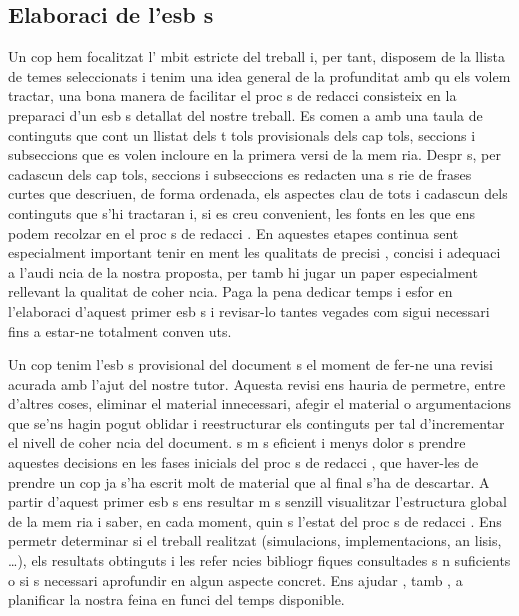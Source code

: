\subsection{Elaboraci  de l'esb s} Un cop hem focalitzat l' mbit estricte del treball i, per tant, disposem de la llista de temes seleccionats i tenim una idea general de la profunditat amb qu  els volem tractar, una bona manera de facilitar el proc s de redacci  consisteix en la preparaci  d'un esb s detallat del nostre treball. Es comen a amb una taula de continguts que cont  un llistat dels t tols provisionals dels cap tols, seccions i subseccions que es volen incloure en la primera versi  de la mem ria. Despr s, per cadascun dels cap tols, seccions i subseccions es redacten una s rie de frases curtes que descriuen, de forma ordenada, els aspectes clau de tots i cadascun dels continguts que s'hi tractaran i, si es creu convenient, les fonts en les que ens podem recolzar en el proc s de redacci . En aquestes etapes continua sent especialment important tenir en ment les qualitats de precisi , concisi  i adequaci  a l'audi ncia de la nostra proposta, per  tamb  hi jugar  un paper especialment rellevant la qualitat de coher ncia. Paga la pena dedicar temps i esfor  en l'elaboraci  d'aquest primer esb s i revisar-lo tantes vegades com sigui necessari fins a estar-ne totalment conven uts.

Un cop tenim l'esb s provisional del document  s el moment de fer-ne una revisi  acurada amb l'ajut del nostre tutor. Aquesta revisi  ens hauria de permetre, entre d'altres coses, eliminar el material innecessari, afegir el material o argumentacions que se'ns hagin pogut oblidar i reestructurar els continguts per tal d'incrementar el nivell de coher ncia del document.  s m s eficient i menys dolor s prendre aquestes decisions en les fases inicials del proc s de redacci , que haver-les de prendre un cop ja s'ha escrit molt de material que al final s'ha de descartar. A partir d'aquest primer esb s ens resultar  m s senzill visualitzar l'estructura global de la mem ria i saber, en cada moment, quin  s l'estat del proc s de redacci . Ens permetr  determinar si el treball realitzat (simulacions, implementacions, an lisis, \ldots), els resultats obtinguts i les refer ncies bibliogr fiques consultades s n suficients o si  s necessari aprofundir en algun aspecte concret. Ens ajudar , tamb , a planificar la nostra feina en funci  del temps disponible.

